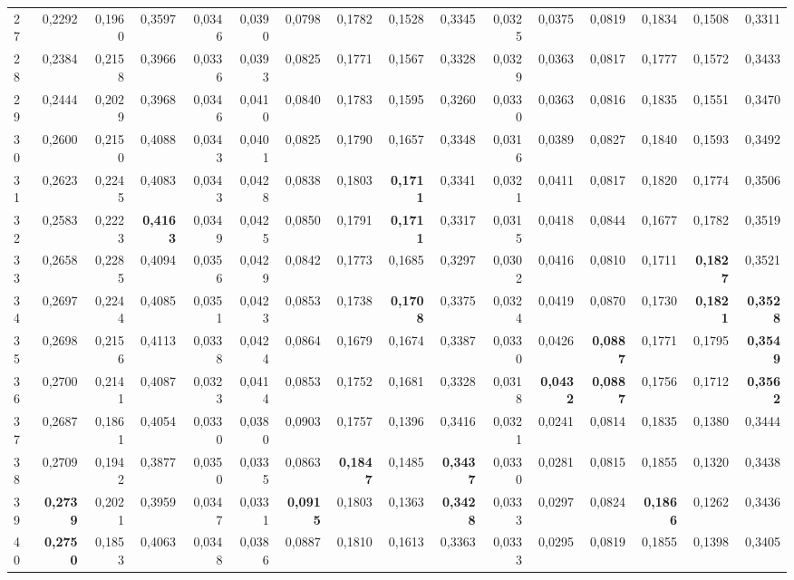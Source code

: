 \begin{table}[htp!]
\begin{adjustwidth}{-2cm}{}
\begin{tabular}{ l | *{15}{| r}}
27	&	0,2292	&	0,1960	&	0,3597	&	0,0346	&	0,0390	&	0,0798	&	0,1782	&	0,1528	&	0,3345	&	0,0325	&	0,0375	&	0,0819	&	0,1834	&	0,1508	&	0,3311	\\
28	&	0,2384	&	0,2158	&	0,3966	&	0,0336	&	0,0393	&	0,0825	&	0,1771	&	0,1567	&	0,3328	&	0,0329	&	0,0363	&	0,0817	&	0,1777	&	0,1572	&	0,3433	\\
29	&	0,2444	&	0,2029	&	0,3968	&	0,0346	&	0,0410	&	0,0840	&	0,1783	&	0,1595	&	0,3260	&	0,0330	&	0,0363	&	0,0816	&	0,1835	&	0,1551	&	0,3470	\\
30	&	0,2600	&	0,2150	&	0,4088	&	0,0343	&	0,0401	&	0,0825	&	0,1790	&	0,1657	&	0,3348	&	0,0316	&	0,0389	&	0,0827	&	0,1840	&	0,1593	&	0,3492	\\
31	&	0,2623	&	0,2245	&	0,4083	&	0,0343	&	0,0428	&	0,0838	&	0,1803	&	\textbf{0,1711}	&	0,3341	&	0,0321	&	0,0411	&	0,0817	&	0,1820	&	0,1774	&	0,3506	\\
32	&	0,2583	&	0,2223	&	\textbf{0,4163}	&	0,0349	&	0,0425	&	0,0850	&	0,1791	&	\textbf{0,1711}	&	0,3317	&	0,0315	&	0,0418	&	0,0844	&	0,1677	&	0,1782	&	0,3519	\\
33	&	0,2658	&	0,2285	&	0,4094	&	0,0356	&	0,0429	&	0,0842	&	0,1773	&	0,1685	&	0,3297	&	0,0302	&	0,0416	&	0,0810	&	0,1711	&	\textbf{0,1827}	&	0,3521	\\
34	&	0,2697	&	0,2244	&	0,4085	&	0,0351	&	0,0423	&	0,0853	&	0,1738	&	\textbf{0,1708}	&	0,3375	&	0,0324	&	0,0419	&	0,0870	&	0,1730	&	\textbf{0,1821}	&	\textbf{0,3528}	\\
35	&	0,2698	&	0,2156	&	0,4113	&	0,0338	&	0,0424	&	0,0864	&	0,1679	&	0,1674	&	0,3387	&	0,0330	&	0,0426	&	\textbf{0,0887}	&	0,1771	&	0,1795	&	\textbf{0,3549}	\\
36	&	0,2700	&	0,2141	&	0,4087	&	0,0323	&	0,0414	&	0,0853	&	0,1752	&	0,1681	&	0,3328	&	0,0318	&	\textbf{0,0432}	&	\textbf{0,0887}	&	0,1756	&	0,1712	&	\textbf{0,3562}	\\
37	&	0,2687	&	0,1861	&	0,4054	&	0,0330	&	0,0380	&	0,0903	&	0,1757	&	0,1396	&	0,3416	&	0,0321	&	0,0241	&	0,0814	&	0,1835	&	0,1380	&	0,3444	\\
38	&	0,2709	&	0,1942	&	0,3877	&	0,0350	&	0,0335	&	0,0863	&	\textbf{0,1847}	&	0,1485	&	\textbf{0,3437}	&	0,0330	&	0,0281	&	0,0815	&	0,1855	&	0,1320	&	0,3438	\\
39	&	\textbf{0,2739}	&	0,2021	&	0,3959	&	0,0347	&	0,0331	&	\textbf{0,0915}	&	0,1803	&	0,1363	&	\textbf{0,3428}	&	0,0333	&	0,0297	&	0,0824	&	\textbf{0,1866}	&	0,1262	&	0,3436	\\
40	&	\textbf{0,2750}	&	0,1853	&	0,4063	&	0,0348	&	0,0386	&	0,0887	&	0,1810	&	0,1613	&	0,3363	&	0,0333	&	0,0295	&	0,0819	&	0,1855	&	0,1398	&	0,3405	\\

\end{tabular}
\end{adjustwidth}
\end{table}
